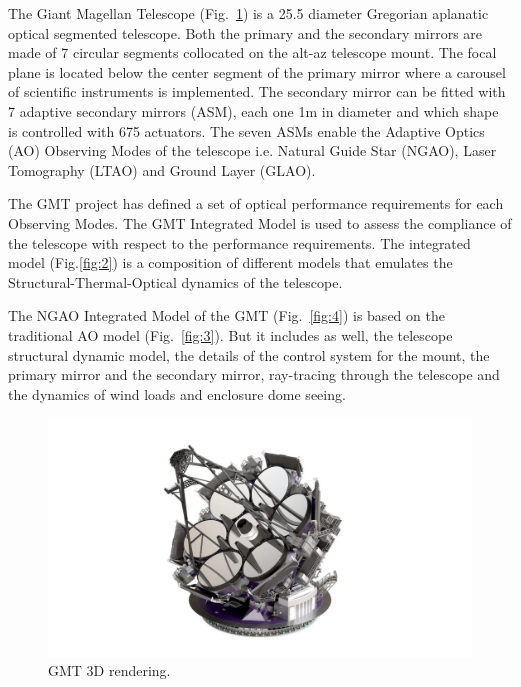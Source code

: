 \documentclass[]{AO4ELT}  %
\begin{document}
The Giant Magellan Telescope (Fig.~\ref{fig:1}) is a 25.5 diameter Gregorian aplanatic optical segmented telescope.
Both the primary and the secondary mirrors are made of 7 circular segments collocated on the alt-az telescope mount.
The focal plane is located below the center segment of the primary mirror where a carousel of scientific instruments is implemented.
The secondary mirror can be fitted with 7 adaptive secondary mirrors (ASM), each one 1m in diameter and which shape is controlled with 675 actuators.
The seven ASMs enable the Adaptive Optics (AO) Observing Modes of the telescope i.e. Natural Guide Star (NGAO), Laser Tomography (LTAO) and Ground Layer (GLAO).

The GMT project has defined a set of optical performance requirements for each Observing Modes.
The GMT Integrated Model is used to assess the compliance of the telescope with respect to the performance requirements.
The integrated model (Fig.\ref{fig:2}) is a composition of different models that emulates the Structural-Thermal-Optical dynamics of the telescope.

The NGAO Integrated Model of the GMT (Fig.~\ref{fig:4}) is based on the traditional AO model (Fig.~\ref{fig:3}).
But it includes as well, the telescope structural dynamic model, the details of the control system for the mount, the primary mirror and the secondary mirror,
ray-tracing through the telescope and the dynamics of wind loads and enclosure dome seeing.


\begin{figure}
   \centering
   \includegraphics[trim=8cm 1cm 9cm 2cm,clip,scale=0.6]{gmt-pretty.png}
   \caption{GMT 3D rendering.}
   \label{fig:1}
\end{figure}
\end{document}

